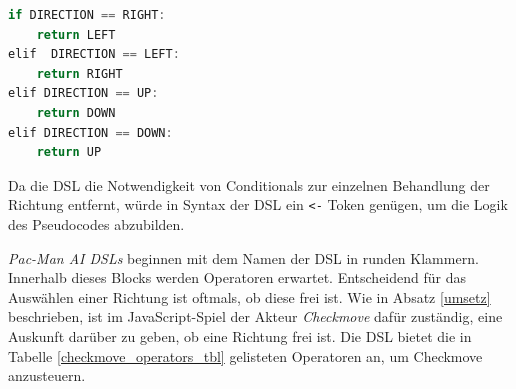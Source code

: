 \documentclass[conference]{IEEEtran}
\begin{document}
\begin{lstlisting}[language=Java, captionpos=b, caption=Umkehren der Richtung in Pseudocode, label=direction_pseudo]
if DIRECTION == RIGHT:
    return LEFT
elif  DIRECTION == LEFT:
    return RIGHT
elif DIRECTION == UP:
    return DOWN
elif DIRECTION == DOWN:
    return UP
\end{lstlisting}

Da die DSL die Notwendigkeit von Conditionals zur einzelnen Behandlung der Richtung entfernt, würde in Syntax der DSL ein \texttt{<-} Token genügen, um  die Logik des Pseudocodes abzubilden.

\emph{Pac-Man AI DSLs} beginnen mit dem Namen der DSL in runden Klammern. Innerhalb dieses Blocks werden Operatoren erwartet. Entscheidend für das Auswählen einer Richtung ist oftmals, ob diese frei ist. Wie in Absatz \ref{umsetz} beschrieben, ist im JavaScript-Spiel der Akteur \emph{Checkmove} dafür zuständig, eine Auskunft darüber zu geben, ob eine Richtung frei ist. Die DSL bietet die in Tabelle \ref{checkmove_operators_tbl} gelisteten Operatoren an, um Checkmove anzusteuern.

\lstset{
  breaklines=true
  }
\end{document}
